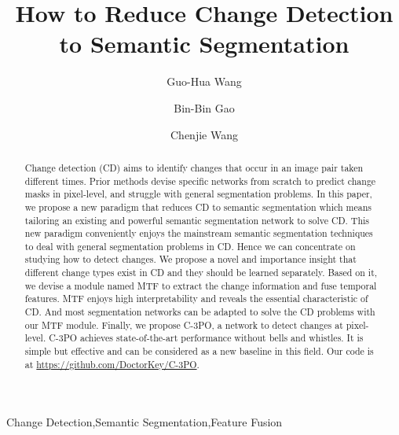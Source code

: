 \documentclass[review]{elsarticle}
\begin{document}
\begin{frontmatter}

\title{How to Reduce Change Detection to Semantic Segmentation}

\author[mymainaddress]{Guo-Hua Wang}
\address[mymainaddress]{State Key Laboratory for Novel Software Technology, Nanjing University, China}

\author[mysecondaryaddress]{Bin-Bin Gao}

\author[mysecondaryaddress,mythirdaddress]{Chenjie Wang}

\address[mysecondaryaddress]{Youtu Lab, Tencent, China}
\address[mythirdaddress]{Department of Computer Science and Engineering, Shanghai Jiao Tong University, China}

\begin{abstract}
Change detection (CD) aims to identify changes that occur in an image pair taken different times. Prior methods devise specific networks from scratch to predict change masks in pixel-level, and struggle with general segmentation problems. In this paper, we propose a new paradigm that reduces CD to semantic segmentation which means tailoring an existing and powerful semantic segmentation network to solve CD. This new paradigm conveniently enjoys the mainstream semantic segmentation techniques to deal with general segmentation problems in CD. Hence we can concentrate on studying how to detect changes. We propose a novel and importance insight that different change types exist in CD and they should be learned separately. Based on it, we devise a module named MTF to extract the change information and fuse temporal features. MTF enjoys high interpretability and reveals the essential characteristic of CD. And most segmentation networks can be adapted to solve the CD problems with our MTF module. Finally, we propose C-3PO, a network to detect changes at pixel-level. C-3PO achieves state-of-the-art performance without bells and whistles. It is simple but effective and can be considered as a new baseline in this field. Our code is at \url{https://github.com/DoctorKey/C-3PO}.
\end{abstract}

\begin{keyword}
Change Detection\sep Semantic Segmentation\sep Feature Fusion
\end{keyword}

\end{frontmatter}
\end{document}
